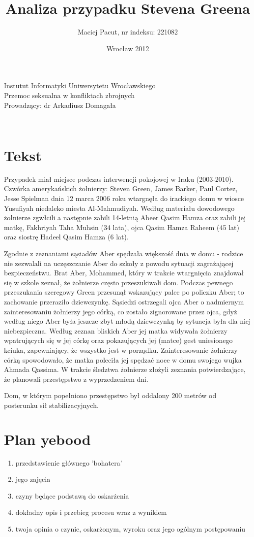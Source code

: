 \documentclass[12pt,a4paper]{article}
\title{Analiza przypadku Stevena Greena}
\author{Maciej Pacut, nr indeksu: 221082}
\date{Wrocław 2012}
\makeatletter
\renewcommand{\maketitle}{\begin{titlepage}
    \vspace*{1cm}
    \begin{center}
      Instutut Informatyki Uniwersytetu Wrocławskiego\\
      Przemoc seksualna w konfliktach zbrojnych \\
      Prowadzący: dr Arkadiusz Domagała \\
      \vspace{3cm}
      \normalsize \@author \par
      \vspace{0.8cm}
      \noindent
      \LARGE \textsc{\@title}\\
      \vspace{1cm}
      \normalsize
    \end{center}
    \vspace{0.5cm}
    \begin{flushright}
      \vspace{5cm}
    \end{flushright}
    \vspace*{\stretch{6}}
    \begin{center}
      \@date
    \end{center}
  \end{titlepage}%
}
\makeatother
\begin{document}
\maketitle
\newpage

\section{Tekst}

Przypadek miał miejsce podczas interwencji pokojowej w Iraku
(2003-2010). Czwórka amerykańskich żołnierzy: Steven Green, James
Barker, Paul Cortez, Jesse Spielman dnia 12 marca 2006 roku wtargnęła
do irackiego domu w wiosce Yusufiyah niedaleko miesta Al-Mahmudiyah.
Według materiału dowodowego żołnierze zgwłcili a następnie zabili
14-letnią Abeer Qasim Hamza oraz zabili jej matkę, Fakhriyah Taha
Muhsin (34 lata), ojca Qasim Hamza Raheem (45 lat) oraz siostrę Hadeel
Qasim Hamza (6 lat).


Zgodnie z zeznaniami sąsiadów Aber spędzała większość dnia w domu -
rodzice nie zezwalali na uczęszczanie Aber do szkoły z powodu sytuacji
zagrażającej bezpieczeństwu. Brat Aber, Mohammed, który w trakcie wtargnięcia
znajdował się w szkole zeznał, że żołnierze często przeszukiwali dom.
Podczas pewnego przeszukania szeregowy Green przesunął wskazujący
palec po policzku Aber; to zachowanie przeraziło dziewczynkę. Sąsiedzi
ostrzegali ojca Aber o nadmiernym zainteresowaniu żołnierzy jego
córką, co zostało zignorowane przez ojca, gdyż według niego Aber była
jeszcze zbyt młodą dziewczynką by sytuacja była dla niej
niebezpieczna. Według zeznan bliskich Aber jej matka widywała
żołnierzy wpatrujących się w jej córkę oraz pokazujących jej (matce)
gest uniesionego kciuka, zapewniający, że wszystko jest w porządku.
Zainteresowanie żołnierzy córką spowodowało, że matka poleciła jej
spędzać noce w domu swojego wujka Ahmada Qassima. W trakcie śledztwa
żołnierze złożyli zeznania potwierdzające, że planowali przestępstwo z
wyprzedzeniem dni.


Dom, w którym popełniono przestępstwo był oddalony 200 metrów od
posterunku sił stabilizacyjnych.



\section{Plan yebood}

\begin{enumerate}
\item przedstawienie głównego 'bohatera'
\item jego zajęcia
\item czyny będące podstawą do oskarżenia
\item dokładny opis i przebieg procesu wraz z wynikiem
\item twoja opinia o czynie, oskarżonym, wyroku oraz jego ogólnym postępowaniu
\end{enumerate}
\end{document}
